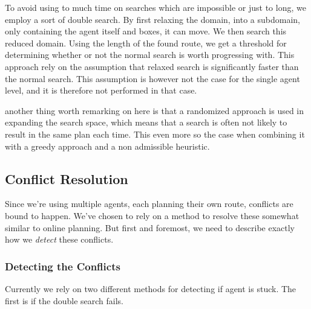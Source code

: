 \documentclass[letterpaper]{article}
\begin{document}
		
		To avoid using to much time on searches which are impossible or just to long, we employ a sort of double search. By first relaxing the domain, into a subdomain, only containing the agent itself and boxes, it can move. We then search this reduced domain. Using the length of the found route, we get a threshold for determining whether or not the normal search is worth progressing with. This approach rely on the assumption that relaxed search is significantly faster than the normal search. This assumption is however not the case for the single agent level, and it is therefore not performed in that case.
		
		
		
		
		another thing worth remarking on here is that a randomized approach is used in expanding the search space, which means that a search is often not likely to result in the same plan each time. This even more so the case when combining it with a greedy approach and a non admissible heuristic.




	\subsection{Conflict Resolution}
		Since we're using multiple agents, each planning their own route, conflicts are bound to happen. We've chosen to rely on a method to resolve these somewhat similar to online planning. But first and foremost, we need to describe exactly how we \emph{detect} these conflicts.

		\subsubsection{Detecting the Conflicts}
			Currently we rely on two different methods for detecting if agent is stuck. The first is if the double search fails.

\end{document}
